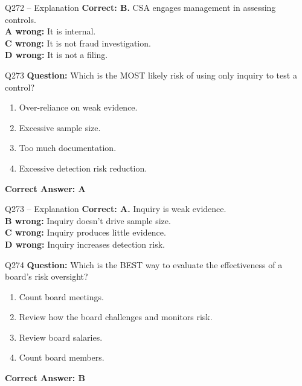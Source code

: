 \documentclass[aspectratio=169,10pt]{beamer}
\begin{document}
	\begin{frame}[t]{Q272 -- Explanation}
		\small
		\textbf{Correct: B.} CSA engages management in assessing controls. \\[4pt]
		\textbf{A wrong:} It is internal. \\[2pt]
		\textbf{C wrong:} It is not fraud investigation. \\[2pt]
		\textbf{D wrong:} It is not a filing.
	\end{frame}
	
	\begin{frame}[t]{Q273}
		\small
		\textbf{Question:} Which is the MOST likely risk of using only inquiry to test a control?
		\begin{enumerate}[label=\Alph*.,itemsep=1pt,topsep=2pt]
			\item Over-reliance on weak evidence.
			\item Excessive sample size.
			\item Too much documentation.
			\item Excessive detection risk reduction.
		\end{enumerate}
		\vspace{4pt}
		\textbf{Correct Answer: A}
	\end{frame}
	
	\begin{frame}[t]{Q273 -- Explanation}
		\small
		\textbf{Correct: A.} Inquiry is weak evidence. \\[4pt]
		\textbf{B wrong:} Inquiry doesn't drive sample size. \\[2pt]
		\textbf{C wrong:} Inquiry produces little evidence. \\[2pt]
		\textbf{D wrong:} Inquiry increases detection risk.
	\end{frame}
	
	\begin{frame}[t]{Q274}
		\small
		\textbf{Question:} Which is the BEST way to evaluate the effectiveness of a board's risk oversight?
		\begin{enumerate}[label=\Alph*.,itemsep=1pt,topsep=2pt]
			\item Count board meetings.
			\item Review how the board challenges and monitors risk.
			\item Review board salaries.
			\item Count board members.
		\end{enumerate}
		\vspace{4pt}
		\textbf{Correct Answer: B}
	\end{frame}
	
\end{document}
